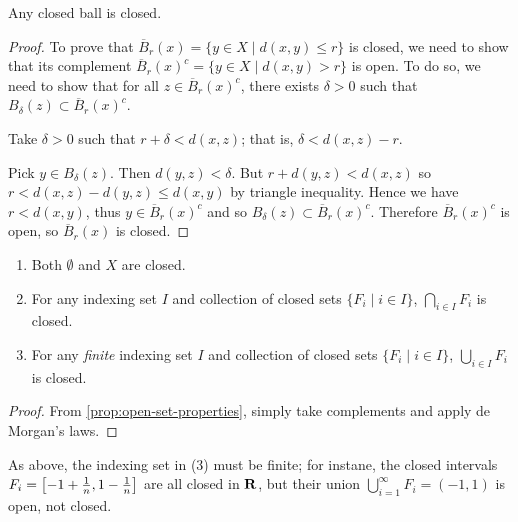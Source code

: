 \begin{proposition}
Any closed ball is closed.
\end{proposition}

\begin{proof}
To prove that $\overline{B}_r(x)=\{y\in X\mid d(x,y)\le r\}$ is closed, we need to show that its complement $\overline{B}_r(x)^c=\{y\in X\mid d(x,y)>r\}$ is open. To do so, we need to show that for all $z\in\overline{B}_r(x)^c$, there exists $\delta>0$ such that $B_\delta(z)\subset\overline{B}_r(x)^c$.

Take $\delta>0$ such that $r+\delta<d(x,z)$; that is, $\delta<d(x,z)-r$.

Pick $y\in B_\delta(z)$. Then $d(y,z)<\delta$. But $r+d(y,z)<d(x,z)$ so $r<d(x,z)-d(y,z)\le d(x,y)$ by triangle inequality. Hence we have $r<d(x,y)$, thus $y\in\overline{B}_r(x)^c$ and so $B_\delta(z)\subset\overline{B}_r(x)^c$. Therefore $\overline{B}_r(x)^c$ is open, so $\overline{B}_r(x)$ is closed.
\end{proof}

\begin{proposition}\label{prop:closed-set-properties}
\begin{enumerate}[label=(\roman*)]
\item Both $\emptyset$ and $X$ are closed.
\item For any indexing set $I$ and collection of closed sets $\{F_i\mid i\in I\}$, $\bigcap_{i\in I}F_i$ is closed.
\item For any \emph{finite} indexing set $I$ and collection of closed sets $\{F_i\mid i\in I\}$, $\bigcup_{i\in I}F_i$ is closed.
\end{enumerate}
\end{proposition}

\begin{proof}
From \cref{prop:open-set-properties}, simply take complements and apply de Morgan's laws.
\end{proof}

\begin{remark}
As above, the indexing set in (3) must be finite; for instane, the closed intervals $F_i=\left[-1+\frac{1}{n},1-\frac{1}{n}\right]$ are all closed in $\mathbf R$, but their union $\bigcup_{i=1}^\infty F_i=(-1,1)$ is open, not closed.
\end{remark}

